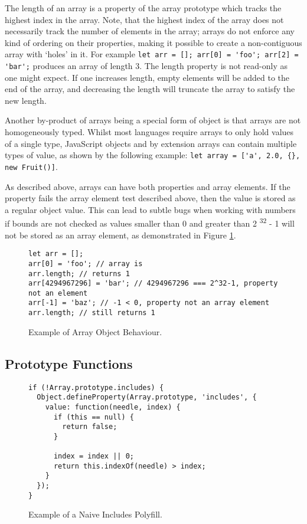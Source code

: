\documentclass[]{final_report}
\begin{document}
The length of an array is a property of the array prototype which tracks the highest index in the array. Note, that the highest index of the array does not necessarily track the number of elements in the array; arrays do not enforce any kind of ordering on their properties, making it possible to create a non-contiguous array with `holes' in it. For example \lstinline|let arr = []; arr[0] = 'foo'; arr[2] = 'bar';| produces an array of length 3. The length property is not read-only as one might expect. If one increases length, empty elements will be added to the end of the array, and decreasing the length will truncate the array to satisfy the new length.

Another by-product of arrays being a special form of object is that arrays are not homogeneously typed. Whilst most languages require arrays to only hold values of a single type, JavaScript objects and by extension arrays can contain multiple types of value, as shown by the following example: \lstinline|let array = ['a', 2.0, {}, new Fruit()]|. 

As described above, arrays can have both properties and array elements. If the property fails the array element test described above, then the value is stored as a regular object value. This can lead to subtle bugs when working with numbers if bounds are not checked as values smaller than 0 and greater than 2 \textsuperscript{32} - 1 will not be stored as an array element, as demonstrated in Figure \ref{fig:js-array-max-length}.

\begin{figure}[t]
\begin{lstlisting}
let arr = [];
arr[0] = 'foo'; // array is 
arr.length; // returns 1
arr[4294967296] = 'bar'; // 4294967296 === 2^32-1, property not an element
arr[-1] = 'baz'; // -1 < 0, property not an array element
arr.length; // still returns 1
\end{lstlisting}
\caption{\label{fig:js-array-max-length} Example of Array Object Behaviour.}
\end{figure}

\subsection{Prototype Functions} \label{sec:array-prototype-functions}

\begin{figure}[t]
\begin{lstlisting}
if (!Array.prototype.includes) {
  Object.defineProperty(Array.prototype, 'includes', {
    value: function(needle, index) {
      if (this == null) {
        return false;
      }

      index = index || 0;
      return this.indexOf(needle) > index;
    }
  });
}
\end{lstlisting}
\caption{\label{fig:naive-includes-polyfill} Example of a Naive Includes Polyfill.}
\end{figure}
\end{document}
